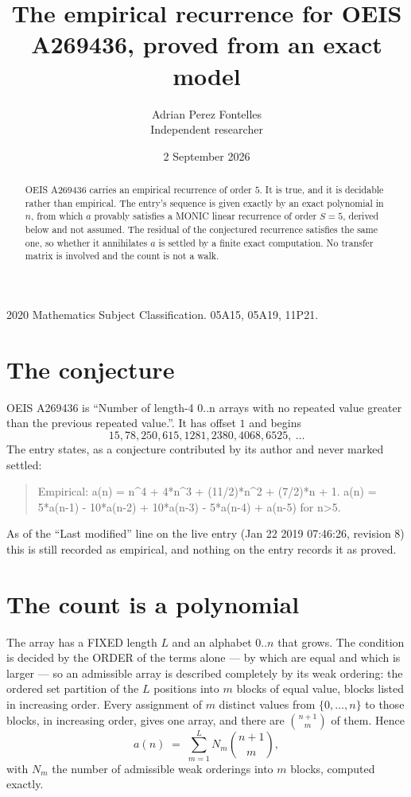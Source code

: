 \documentclass[11pt,a4paper]{article}
\title{The empirical recurrence for OEIS A269436, proved from an exact model}
\author{Adrian Perez Fontelles\\ \small Independent researcher}
\date{2 September 2026}
\theoremstyle{plain}
\theoremstyle{definition}
\begin{document}
\maketitle

\begin{abstract}
OEIS A269436 carries an empirical recurrence of order $5$. It is true, and it is
decidable rather than empirical. The entry's sequence is given exactly by an exact polynomial in $n$, from
which $a$ provably satisfies a MONIC linear recurrence of order $S=5$, derived below and not
assumed. The residual of the conjectured recurrence satisfies the same one, so whether it
annihilates $a$ is settled by a finite exact computation. No transfer matrix is involved and
the count is not a walk.
\end{abstract}

\noindent\small 2020 Mathematics Subject Classification. 05A15, 05A19, 11P21.\normalsize

\section{The conjecture}

OEIS A269436 is ``Number of length-4 0..n arrays with no repeated value greater than the previous repeated value.''. It has offset $1$ and begins
\[
15, 78, 250, 615, 1281, 2380, 4068, 6525,\ \dots
\]
The entry states, as a conjecture contributed by its author and never marked settled:
\begin{quote}
Empirical: a(n) = n\^{}4 + 4*n\^{}3 + (11/2)*n\^{}2 + (7/2)*n + 1. a(n) = 5*a(n-1) - 10*a(n-2) + 10*a(n-3) - 5*a(n-4) + a(n-5) for n>5.
\end{quote}
As of the ``Last modified'' line on the live entry (Jan 22 2019 07:46:26, revision 8)
this is still recorded as empirical, and nothing on the entry records it as proved.

\section{The count is a polynomial}

The array has a FIXED length $L$ and an alphabet $0..n$ that grows. The condition is decided by
the ORDER of the terms alone --- by which are equal and which is larger --- so an admissible
array is described completely by its weak ordering: the ordered set partition of the $L$
positions into $m$ blocks of equal value, blocks listed in increasing order. Every assignment
of $m$ distinct values from $\{0,\dots,n\}$ to those blocks, in increasing order, gives one
array, and there are $\binom{n+1}{m}$ of them. Hence
\[
a(n)\;=\;\sum_{m=1}^{L} N_m\binom{n+1}{m},
\]
with $N_m$ the number of admissible weak orderings into $m$ blocks, computed exactly.
\end{document}
